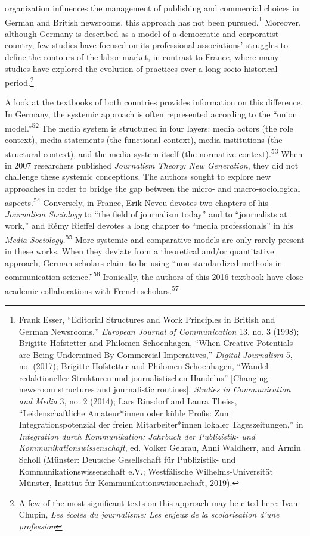 \documentclass{tufte-handout}
\begin{document}
organization influences the management of publishing and commercial
choices in German and British newsrooms, this approach has not been
pursued.\footnote{Frank Esser, ``Editorial Structures and Work
  Principles in British and German Newsrooms,'' \emph{European Journal
  of Communication} 13, no. 3 (1998); Brigitte Hofstetter and Philomen
  Schoenhagen, ``When Creative Potentials are Being Undermined By
  Commercial Imperatives,'' \emph{Digital Journalism} 5, no. (2017);
  Brigitte Hofstetter and Philomen Schoenhagen, ``Wandel redaktioneller
  Strukturen und journalistischen Handelns'' {[}Changing newsroom
  structures and journalistic routines{]}, \emph{Studies in
  Communication and Media} 3, no. 2 (2014); Lars Rinsdorf and Laura
  Theiss, ``Leidenschaftliche Amateur*innen oder kühle Profis: Zum
  Integrationspotenzial der freien Mitarbeiter*innen lokaler
  Tageszeitungen,'' in \emph{Integration durch Kommunikation: Jahrbuch
  der Publizistik- und Kommunikationswissenschaft}, ed. Volker Gehrau,
  Anni Waldherr, and Armin Scholl (Münster: Deutsche Gesellschaft für
  Publizistik- und Kommunikationswissenschaft e.V.; Westfälische
  Wilhelms-Universität Münster, Institut für Kommunikationswissenschaft,
  2019).} Moreover, although Germany is described as a model of a
democratic and corporatist country, few studies have focused on its
professional associations' struggles to define the contours of the labor
market, in contrast to France, where many studies have explored the
evolution of practices over a long socio-historical period.\footnote{A
  few of the most significant texts on this approach may be cited here:
  Ivan Chupin, \emph{Les écoles du journalisme: Les enjeux de la
  scolarisation d'une profession}}

A look at the textbooks of both countries provides information on this
difference. In Germany, the systemic approach is often represented
according to the ``onion model.''\textsuperscript{52} The media system is structured in
four layers: media actors (the role context), media statements (the
functional context), media institutions (the structural context), and
the media system itself (the normative context).\textsuperscript{53} When in 2007 researchers
published \emph{Journalism Theory: New Generation}, they did not
challenge these systemic conceptions. The authors sought to explore new
approaches in order to bridge the gap between the micro- and
macro-sociological aspects.\textsuperscript{54} Conversely, in France, Erik Neveu
devotes two chapters of his \emph{Journalism Sociology} to ``the field
of journalism today'' and to ``journalists at work,'' and Rémy Rieffel
devotes a long chapter to ``media professionals'' in his \emph{Media
Sociology.}\textsuperscript{55} More systemic and comparative models
are only rarely present in these works. When they deviate from a
theoretical and/or quantitative approach, German scholars claim to be
using ``non-standardized methods in communication science.''\textsuperscript{56} Ironically, the authors of this 2016
textbook have close academic collaborations with French
scholars.\textsuperscript{57}
\end{document}
